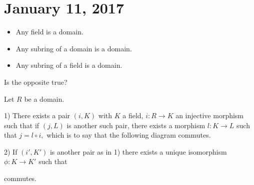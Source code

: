 \section{January 11, 2017}
\begin{rmk}
\begin{itemize}
        \item Any field is a domain.
        \item Any subring of a domain is a domain.
        \item Any subring of a field is a domain.
    \end{itemize}
Is the opposite true?
\end{rmk}
\begin{thm}
Let $R$ be a domain.

1) There exists a pair $(i,K)$ with $K$ a field, $i:R\rightarrow K$ an injective morphism such that if $(j,L)$ is another such pair, there exists a morphism $l:K\rightarrow L$ such that $j=l\circ i,$ which is to say that the following diagram commutes.


2) If $(i',K')$ is another pair as in 1) there exists a unique isomorphism $\phi:K\rightarrow K'$ such that

 commutes.

\end{thm}

